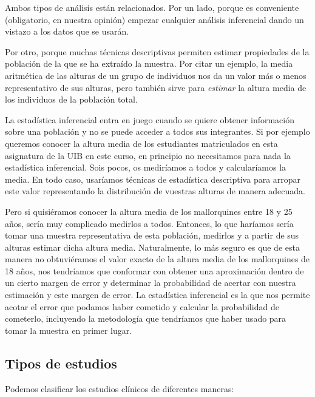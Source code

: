 \documentclass[
  letterpaper,
  DIV=11,
  numbers=noendperiod]{scrreprt}
\begin{document}
Ambos tipos de análisis están relacionados. Por un lado, porque es
conveniente (obligatorio, en nuestra opinión) empezar cualquier análisis
inferencial dando un vistazo a los datos que se usarán.

Por otro, porque muchas técnicas descriptivas permiten estimar
propiedades de la población de la que se ha extraído la muestra. Por
citar un ejemplo, la media aritmética de las alturas de un grupo de
individuos nos da un valor más o menos representativo de sus alturas,
pero también sirve para \emph{estimar} la altura media de los individuos
de la población total.

La estadística inferencial entra en juego cuando se quiere obtener
información sobre una población y no se puede acceder a todos sus
integrantes. Si por ejemplo queremos conocer la altura media de los
estudiantes matriculados en esta asignatura de la UIB en este curso, en
principio no necesitamos para nada la estadística inferencial. Sois
pocos, os mediríamos a todos y calcularíamos la media. En todo caso,
usaríamos técnicas de estadística descriptiva para arropar este valor
representando la distribución de vuestras alturas de manera adecuada.

Pero si quisiéramos conocer la altura media de los mallorquines entre 18
y 25 años, sería muy complicado medirlos a todos. Entonces, lo que
haríamos sería tomar una muestra representativa de esta población,
medirlos y a partir de sus alturas estimar dicha altura media.
Naturalmente, lo más seguro es que de esta manera no obtuviéramos el
valor exacto de la altura media de los mallorquines de 18 años, nos
tendríamos que conformar con obtener una aproximación dentro de un
cierto margen de error y determinar la probabilidad de acertar con
nuestra estimación y este margen de error. La estadística inferencial es
la que nos permite acotar el error que podamos haber cometido y calcular
la probabilidad de cometerlo, incluyendo la metodología que tendríamos
que haber usado para tomar la muestra en primer lugar.

\subsection{Tipos de estudios}\label{tipos-de-estudios}

Podemos clasificar los estudios clínicos de diferentes maneras:
\end{document}
